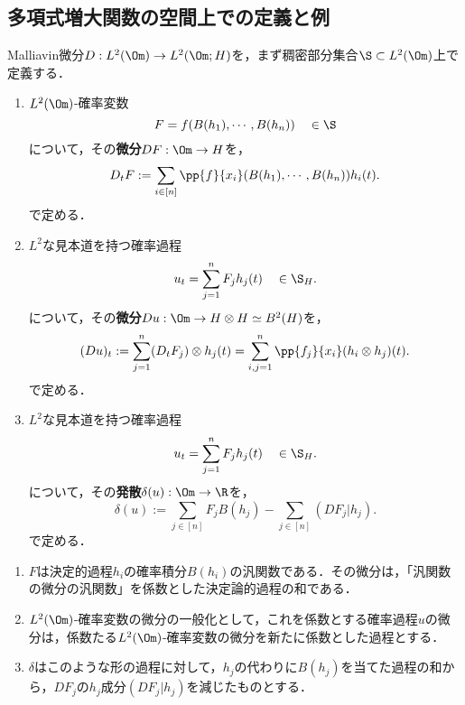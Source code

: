 \documentclass[uplatex,dvipdfmx]{jsreport}
\begin{document}
\subsection{多項式増大関数の空間上での定義と例}

\begin{tcolorbox}[colframe=ForestGreen, colback=ForestGreen!10!white,breakable,colbacktitle=ForestGreen!40!white,coltitle=black,fonttitle=\bfseries\sffamily,
title=]
    Malliavin微分$D:L^2(\Om)\to L^2(\Om;H)$を，まず稠密部分集合$\S\subset L^2(\Om)$上で定義する．
\end{tcolorbox}

\begin{definition}\mbox{}
    \begin{enumerate}
        \item $L^2(\Om)$-確率変数
        \[F=f(B(h_1),\cdots,B(h_n))\quad\in\S\]
        について，その\textbf{微分}$DF:\Om\to H$を，
        \[D_tF:=\sum_{i\in[n]}\pp{f}{x_i}(B(h_1),\cdots,B(h_n))h_i(t).\]
        で定める．
        \item $L^2$な見本道を持つ確率過程
        \[u_t=\sum_{j=1}^nF_jh_j(t)\quad\in\S_H.\]
        について，その\textbf{微分}$Du:\Om\to H\otimes H\simeq B^2(H)$を，
        \[(Du)_t:=\sum_{j=1}^n(D_tF_j)\otimes h_j(t)=\sum_{i,j=1}^n\pp{f_j}{x_i}(h_i\otimes h_j)(t).\]
        で定める．
        \item $L^2$な見本道を持つ確率過程
        \[u_t=\sum_{j=1}^nF_jh_j(t)\quad\in\S_H.\]
        について，その\textbf{発散}$\delta(u):\Om\to\R$を，
        \[\delta(u):=\sum_{j\in[n]}F_jB(h_j)-\sum_{j\in[n]}(DF_j|h_j).\]
        で定める．
    \end{enumerate}
\end{definition}
\begin{remarks}\mbox{}
    \begin{enumerate}
        \item $F$は決定的過程$h_i$の確率積分$B(h_i)$の汎関数である．その微分は，「汎関数の微分の汎関数」を係数とした決定論的過程の和である．
        \item $L^2(\Om)$-確率変数の微分の一般化として，これを係数とする確率過程$u$の微分は，係数たる$L^2(\Om)$-確率変数の微分を新たに係数とした過程とする．
        \item $\delta$はこのような形の過程に対して，$h_j$の代わりに$B(h_j)$を当てた過程の和から，$DF_j$の$h_j$成分$(DF_j|h_j)$を減じたものとする．
    \end{enumerate}
\end{remarks}
\end{document}
